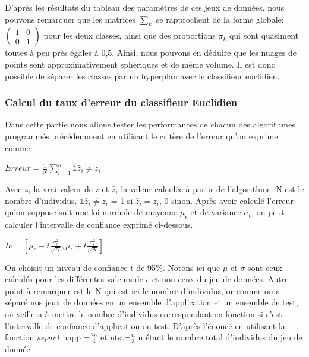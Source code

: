 \documentclass[10pt]{article}
\begin{document}
	D'après les résultats du tableau des paramètres de ces jeux de données, nous pouvons remarquer que les matrices $\sum_{k}$ se rapprochent de la forme globale: $\begin{pmatrix} 1 & 0 \\ 0 & 1 \end{pmatrix}$ pour les deux classes, ainsi que des proportions $\pi_{k} $ qui sont quasiment toutes à peu près égales à 0,5. Ainsi, nous pouvons en déduire que les nuages de points sont approximativement sphériques et de même volume. Il est donc possible de séparer les classes par un hyperplan avec le classifieur euclidien.
	
			\subsubsection{Calcul du taux d'erreur du classifieur Euclidien }
			Dans cette partie nous allons tester les performances de chacun des algorithmes programmés précédemment en utilisant le critère de l'erreur qu'on exprime comme:
			\begin{center}
			$Erreur = \frac{1}{N} \sum_{i=1}^{n} {\mathds{1} \hat{z}_{i}  \neq z_{i}}$
			\end{center}
		Avec $z_{i}$ la vrai valeur de z et $\hat{z}_{i}$ la valeur calculée à partir de l'algorithme. N est le nombre d'individus. $\mathds{1} \hat{z}_{i}  \neq z_{i}$ = 1 si $\hat{z}_{i}  = z_{i}$, 0 sinon.
		Après avoir calculé l'erreur qu'on suppose suit une loi normale de moyenne $\mu_{\epsilon}$ et de variance $\sigma_{\epsilon}$, on peut calculer l'intervalle de confiance exprimé ci-dessous.
		\begin{center}
		$Ic = [\mu_\epsilon - t \frac{\sigma_{\epsilon}^2}{\sqrt{N}}, \mu_\epsilon + t \frac{\sigma_{\epsilon}^2}{\sqrt{N}}]$
		\end{center}
	
		On choisit un niveau de confiance t de 95\%. Notons ici que  $\mu$ et $\sigma$ sont ceux calculés pour les différentes valeurs de $\epsilon$ et non ceux du jeu de données. Autre point à remarquer est le N qui est ici le nombre d'individus, or comme on a séparé nos jeux de données en un ensemble d'application et un ensemble de test, on veillera à mettre le nombre d'individus correspondant en fonction si c'est l'intervalle de confiance  d'application ou test. D'après l'énoncé en utilisant la fonction \textit{separ1} napp =$\frac{2n}{3}$  et ntst=$\frac{n}{3}$ n étant le nombre total d'individus du jeu de donnée.
			
\end{document}
